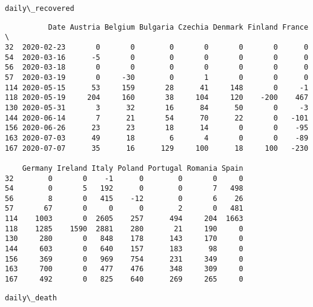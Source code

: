 \documentclass[11pt]{article}
\begin{document}
    
    \begin{Verbatim}[commandchars=\\\{\}]
daily\_recovered
    \end{Verbatim}

    
    \begin{verbatim}
          Date Austria Belgium Bulgaria Czechia Denmark Finland France  \
32  2020-02-23       0       0        0       0       0       0      0   
54  2020-03-16      -5       0        0       0       0       0      0   
56  2020-03-18       0       0        0       0       0       0      0   
57  2020-03-19       0     -30        0       1       0       0      0   
114 2020-05-15      53     159       28      41     148       0     -1   
118 2020-05-19     204     160       38     104     120    -200    467   
130 2020-05-31       3      32       16      84      50       0     -3   
144 2020-06-14       7      21       54      70      22       0   -101   
156 2020-06-26      23      23       18      14       0       0    -95   
163 2020-07-03      49      18        6       4       0       0    -89   
167 2020-07-07      35      16      129     100      18     100   -230   

    Germany Ireland Italy Poland Portugal Romania Spain  
32        0       0    -1      0        0       0     0  
54        0       5   192      0        0       7   498  
56        8       0   415    -12        0       6    26  
57       67       0     0      0        2       0   481  
114    1003       0  2605    257      494     204  1663  
118    1285    1590  2881    280       21     190     0  
130     280       0   848    178      143     170     0  
144     603       0   640    157      183      98     0  
156     369       0   969    754      231     349     0  
163     700       0   477    476      348     309     0  
167     492       0   825    640      269     265     0  
    \end{verbatim}

    
    \begin{Verbatim}[commandchars=\\\{\}]
daily\_death
    \end{Verbatim}
\end{document}
